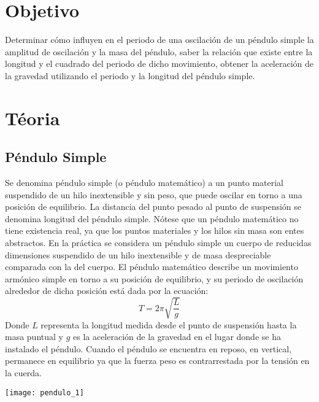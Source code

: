 \documentclass[11pt]{article}
\newenvironment{Figuras}
  {\par\medskip\noindent\minipage{\linewidth}}
  {\endminipage\par\medskip}
\begin{document}
\begin{multicols}{2}

\section{Objetivo}
Determinar cómo influyen en el periodo de una oscilación de un péndulo simple la amplitud de oscilación y la masa del péndulo, saber la relación que existe entre la longitud y el cuadrado del periodo de dicho movimiento, obtener la aceleración de la gravedad utilizando el periodo y la longitud del péndulo simple.

\section{Téoria}

	\subsection{Péndulo Simple}
	Se denomina péndulo simple (o péndulo matemático) a un punto material suspendido de un hilo inextensible y sin peso, que puede oscilar en torno a una posición de equilibrio. La distancia del punto pesado al punto de suspensión se denomina longitud del péndulo simple. Nótese que un péndulo matemático no tiene existencia real, ya que los puntos materiales y los hilos sin masa son entes abstractos. En la práctica se considera un péndulo simple un cuerpo de reducidas dimensiones suspendido de un hilo inextensible y de masa despreciable comparada con la del cuerpo. 
El péndulo matemático describe un movimiento armónico simple en torno a su posición de equilibrio, y su periodo de oscilación alrededor de dicha posición está dada por la ecuación:
$$T=2\pi \sqrt{\frac{L}{g}}$$
Donde $L$ representa la longitud medida desde el punto de suspensión hasta la masa puntual y $g$ es la aceleración de la gravedad en el lugar donde se ha instalado el péndulo.
Cuando el péndulo se encuentra en reposo, en vertical, permanece en equilibrio ya que la fuerza peso es contrarrestada por la tensión en la cuerda.	

\begin{Figuras}
	\centering
    \texttt{[image: pendulo\_1]}
    \label{fig:mesh1}
\end{Figuras}


\end{multicols}
\end{document}
